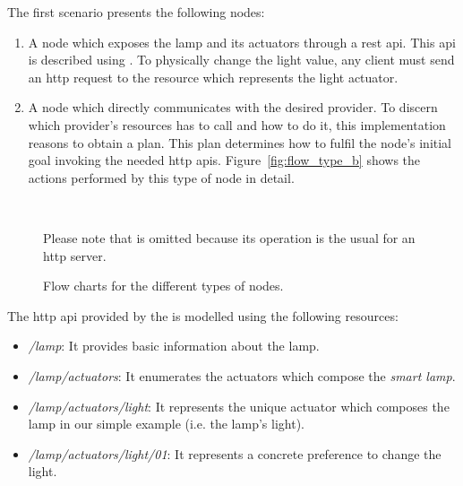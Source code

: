 The first scenario presents the following nodes:
\begin{enumerate}[label=\itshape(\alph*\upshape)]
  \item A node which exposes the lamp and its actuators through a \ac{rest} \ac{api}.
	This \ac{api} is described using \restdesc{}. %
	To physically change the light value, any client must send an \acs{http} request to the resource which represents the light actuator.
	
  \item A node which directly communicates with the desired provider.
	To discern which provider's resources has to call and how to do it, this implementation reasons to obtain a plan.
	This plan determines how to fulfil the node's initial goal invoking the needed \ac{http} \acsp{api}.
	Figure~\ref{fig:flow_type_b} shows the actions performed by this type of node in detail.
\end{enumerate}



\begin{figure}
        \centering %
	~ %
        ~ %
        \caption{Flow charts for the different types of nodes.}
        {Please note that \nodea{} is omitted because its operation is the usual for an \acs{http} server.} %
        \label{fig:flow_nodes}
\end{figure}



The \acs{http} \acs{api} provided by the \nodea{} is modelled using the following resources:
\begin{itemize}
  \item \emph{/lamp}: It provides basic information about the lamp.
  \item \emph{/lamp/actuators}: It enumerates the actuators which compose the \emph{smart lamp}.
  \item \emph{/lamp/actuators/light}: It represents the unique actuator which composes the lamp in our simple example (i.e. the lamp's light).
  \item \emph{/lamp/actuators/light/01}: It represents a concrete preference to change the light.
\end{itemize}


